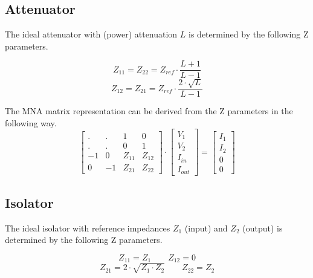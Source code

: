 \subsection{Attenuator}

The ideal attenuator with (power) attenuation $L$ is determined by the
following Z parameters.

\begin{equation}
Z_{11} = Z_{22} = Z_{ref}\cdot\frac{L+1}{L-1}
\end{equation}
\begin{equation}
Z_{12} = Z_{21} = Z_{ref}\cdot\frac{2\cdot\sqrt{L}}{L-1}
\end{equation}

The MNA matrix representation can be derived from the Z parameters in the
following way.
\begin{equation}
\begin{bmatrix}
 . & .  &  1 & 0\\
 . & .  &  0 & 1\\
-1 &  0 & Z_{11} & Z_{12}\\
 0 & -1 & Z_{21} & Z_{22}
\end{bmatrix}
\cdot
\begin{bmatrix}
V_{1}\\
V_{2}\\
I_{in}\\
I_{out}
\end{bmatrix}
=
\begin{bmatrix}
I_{1}\\
I_{2}\\
0\\
0
\end{bmatrix}
\end{equation}


\subsection{Isolator}

The ideal isolator with reference impedances $Z_1$ (input) and $Z_2$
(output) is determined by the following Z parameters.

\begin{equation}
Z_{11} = Z_1  \qquad
Z_{12} = 0
\end{equation}
\begin{equation}
Z_{21} = 2\cdot\sqrt{Z_1\cdot Z_2}  \qquad
Z_{22} = Z_2
\end{equation}


